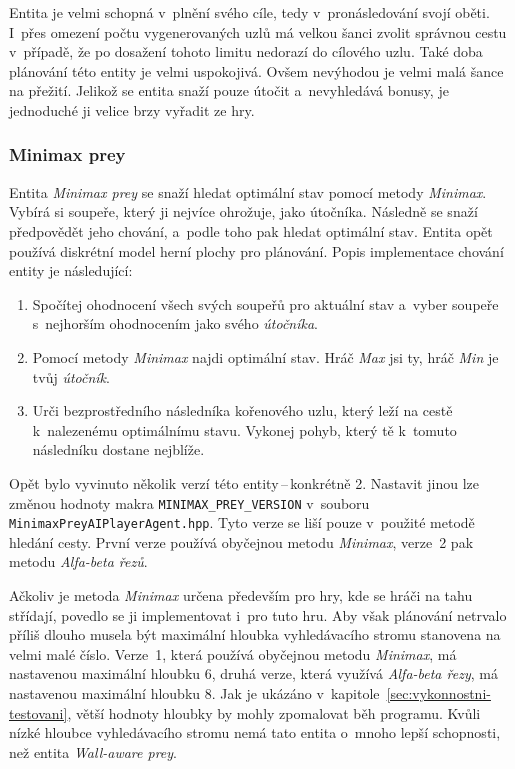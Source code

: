 Entita je velmi schopná v~plnění svého cíle, tedy v~pronásledování svojí oběti. I~přes omezení počtu vygenerovaných uzlů má velkou šanci zvolit správnou cestu v~případě, že po dosažení tohoto limitu nedorazí do cílového uzlu. Také doba plánování této entity je velmi uspokojivá. Ovšem nevýhodou je velmi malá šance na přežití. Jelikož se entita snaží pouze útočit a~nevyhledává bonusy, je jednoduché ji velice brzy vyřadit ze hry.

\subsubsection*{Minimax prey}

Entita \emph{Minimax prey} se snaží hledat optimální stav pomocí metody \emph{Minimax}. Vybírá si soupeře, který ji nejvíce ohrožuje, jako útočníka. Následně se snaží předpovědět jeho chování, a~podle toho pak hledat optimální stav. Entita opět používá diskrétní model herní plochy pro plánování. Popis implementace chování entity je následující:
\begin{enumerate}
    \item Spočítej ohodnocení všech svých soupeřů pro aktuální stav a~vyber soupeře s~nejhorším ohodnocením jako svého \emph{útočníka}.
    \item Pomocí metody \emph{Minimax} najdi optimální stav. Hráč \emph{Max} jsi ty, hráč \emph{Min} je tvůj \emph{útočník}.
    \item Urči bezprostředního následníka kořenového uzlu, který leží na cestě k~nalezenému optimálnímu stavu. Vykonej pohyb, který tě k~tomuto následníku dostane nejblíže.
\end{enumerate}

Opět bylo vyvinuto několik verzí této entity\,--\,konkrétně 2. Nastavit jinou lze změnou hodnoty makra \texttt{MINIMAX\_PREY\_VERSION} v~souboru \texttt{MinimaxPreyAIPlayerAgent.hpp}. Tyto verze se liší pouze v~použité metodě hledání cesty. První verze používá obyčejnou metodu \emph{Minimax}, verze~2 pak metodu \emph{Alfa-beta řezů}.

Ačkoliv je metoda \emph{Minimax} určena především pro hry, kde se hráči na tahu střídají, povedlo se ji implementovat i~pro tuto hru. Aby však plánování netrvalo příliš dlouho musela být maximální hloubka vyhledávacího stromu stanovena na velmi malé číslo. Verze~1, která používá obyčejnou metodu \emph{Minimax}, má nastavenou maximální hloubku 6, druhá verze, která využívá \emph{Alfa-beta řezy}, má nastavenou maximální hloubku 8. Jak je ukázáno v~kapitole~\ref{sec:vykonnostni-testovani}, větší hodnoty hloubky by mohly zpomalovat běh programu. Kvůli nízké hloubce vyhledávacího stromu nemá tato entita o~mnoho lepší schopnosti, než  entita \emph{Wall-aware prey}.

